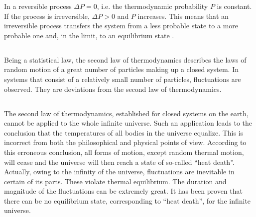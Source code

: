 In a reversible process  $\Delta P = 0$, i.e. the thermodynamic probability $P$ is constant. If the process is irreversible,  $\Delta P > 0$ and $P$ increases. This means that an irreversible process transfers the system from a less probable state to a more probable one and, in the limit, to an equilibrium state .

\subsection{}\label{11.5.3} Being a statistical law, the second law of thermodynamics describes the laws of random motion of a great number of particles making up a closed system. In systems that consist of a relatively small number of particles, fluctuations  are observed. They are deviations from the second law of thermodynamics.

\subsection{}\label{11.5.4} The second law of thermodynamics, established for closed systems on the earth, cannot be applied to the whole infinite universe. Such an application leads to the conclusion that the temperatures of all bodies in the universe equalize. This is incorrect from both the philosophical and physical points of view. According to this erroneous conclusion, all forms of motion, except random thermal motion, will cease and the universe will then reach a state of so-called ``heat death''. Actually, owing to the infinity of the universe, fluctuations  are inevitable in certain of its parts. These violate thermal equilibrium. The duration and magnitude of the fluctuations can be extremely great. It has been proven that there can be no equilibrium state, corresponding to ``heat death'', for the infinite universe.

